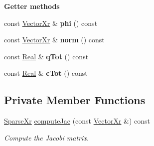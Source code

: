 \begin{Indent}{\bf Getter methods}\par
\begin{DoxyCompactItemize}
\item 
\hypertarget{classNonLinearPoisson1D_a49da0d6a457d7d2d996926ea813ec55f}{const \hyperlink{typedefs_8h_aae6cee78ed9cd8f234ed8cb48682548a}{Vector\-Xr} \& {\bfseries phi} () const }\label{classNonLinearPoisson1D_a49da0d6a457d7d2d996926ea813ec55f}

\item 
\hypertarget{classNonLinearPoisson1D_a146128a8e8cc2cad80edb7883e4823b8}{const \hyperlink{typedefs_8h_aae6cee78ed9cd8f234ed8cb48682548a}{Vector\-Xr} \& {\bfseries norm} () const }\label{classNonLinearPoisson1D_a146128a8e8cc2cad80edb7883e4823b8}

\item 
\hypertarget{classNonLinearPoisson1D_af46d2aa1358eab6b5d547cf40ba8a720}{const \hyperlink{typedefs_8h_a060b837c3b4486ee35317744156f3da2}{Real} \& {\bfseries q\-Tot} () const }\label{classNonLinearPoisson1D_af46d2aa1358eab6b5d547cf40ba8a720}

\item 
\hypertarget{classNonLinearPoisson1D_a341de5204baac856de6f8b6ed3721414}{const \hyperlink{typedefs_8h_a060b837c3b4486ee35317744156f3da2}{Real} \& {\bfseries c\-Tot} () const }\label{classNonLinearPoisson1D_a341de5204baac856de6f8b6ed3721414}

\end{DoxyCompactItemize}
\end{Indent}
\subsection*{Private Member Functions}
\begin{DoxyCompactItemize}
\item 
\hyperlink{typedefs_8h_a6d3b7db3fa8171d0e743df848524c269}{Sparse\-Xr} \hyperlink{classNonLinearPoisson1D_aeb48e911a352f4115f872f28a188b10a}{compute\-Jac} (const \hyperlink{typedefs_8h_aae6cee78ed9cd8f234ed8cb48682548a}{Vector\-Xr} \&) const 
\begin{DoxyCompactList}\small\item\em Compute the Jacobi matrix. \end{DoxyCompactList}\end{DoxyCompactItemize}
